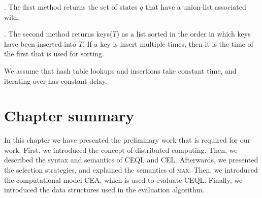 . The first method returns the set of states $q$ that have a union-list associated with.

. The second method returns keys($T$) as a list sorted in the order in which keys have been inserted into $T$. If a key is insert multiple times, then it is the time of the first that is used for sorting.

We assume that hash table lookups and insertions take constant time, and iterating over has constant delay.


\section{Chapter summary}

In this chapter we have presented the preliminary work that is required for our work. First, we introduced the concept of distributed computing. Then, we described the syntax and semantics of CEQL and CEL. Afterwards, we presented the selection strategies, and explained the semantics of \textsc{max}. Then, we introduced the computational model CEA, which is used to evaluate CEQL. Finally, we introduced the data structures used in the evaluation algorithm.
